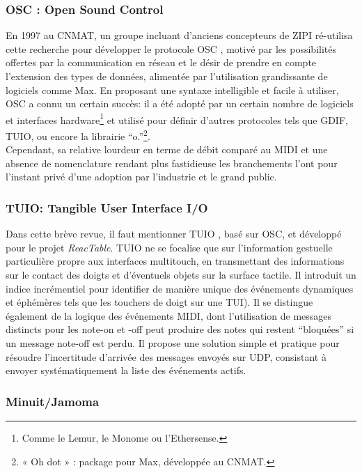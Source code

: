 \subsubsection{OSC : Open Sound Control}

\noindent En 1997 au \gls{CNMAT}, un groupe incluant d'anciens concepteurs de \gls{ZIPI} ré-utilisa cette recherche pour développer le protocole \gls{OSC} \cite{wright_open_1997}, motivé par les possibilités offertes par la communication en réseau et le désir de prendre en compte l'extension des types de données, alimentée par l'utilisation grandissante de logiciels comme Max. En proposant une syntaxe intelligible et facile à utiliser, \gls{OSC} a connu un certain succès: il a été adopté par un certain nombre de logiciels et interfaces hardware\footnote{ Comme le Lemur, le Monome ou l'Ethersense.} et utilisé pour définir d'autres protocoles tels que \gls{GDIF}, \gls{TUIO}, ou encore la librairie ``o.''\footnote{ « Oh dot » : package pour Max, développée au \gls{CNMAT}.}.\\
\indent Cependant, sa relative lourdeur en terme de débit comparé au \gls{MIDI} \cite{fraietta_open_2008} et une absence de nomenclature rendant plus fastidieuse les branchements l'ont pour l'instant privé d'une adoption par l'industrie et le grand public.

\subsubsection{TUIO: Tangible User Interface I/O}

\noindent Dans cette brève revue, il faut mentionner \gls{TUIO} \cite{kaltenbrunner_tuio:_2005}, basé sur \gls{OSC}, et développé pour le projet \textit{ReacTable}. \gls{TUIO} ne se focalise que sur l'information gestuelle particulière propre aux interfaces multitouch, en transmettant des informations sur le contact des doigts et d'éventuels objets sur la surface tactile. Il introduit un indice incrémentiel pour identifier de manière unique des événements dynamiques et éphémères tels que les touchers de doigt sur une \gls{TUI}). Il se distingue également de la logique des événements \gls{MIDI}, dont l'utilisation de messages distincts pour les note-on et -off peut produire des notes qui restent ``bloquées'' si un message note-off est perdu. Il propose une solution simple et pratique pour résoudre l'incertitude d'arrivée des messages envoyés sur \gls{UDP}, consistant à envoyer systématiquement la liste des événements actifs.

\subsubsection{Minuit/Jamoma}

